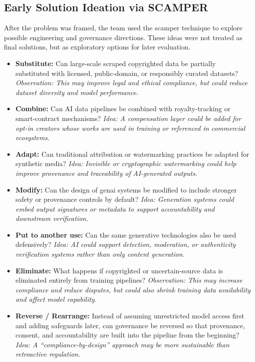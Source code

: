 \subsection{Early Solution Ideation via SCAMPER}\label{app:scamper}
After the problem was framed, the team used the \ac{scamper} technique to explore possible engineering and governance directions. These ideas were not treated as final solutions, but as exploratory options for later evaluation.

\begin{itemize}
    \item \textbf{Substitute:} Can large-scale scraped copyrighted data be partially substituted with licensed, public-domain, or responsibly curated datasets? \textit{Observation: This may improve legal and ethical compliance, but could reduce dataset diversity and model performance.}

    \item \textbf{Combine:} Can AI data pipelines be combined with royalty-tracking or smart-contract mechanisms? \textit{Idea: A compensation layer could be added for opt-in creators whose works are used in training or referenced in commercial ecosystems.}

    \item \textbf{Adapt:} Can traditional attribution or watermarking practices be adapted for synthetic media? \textit{Idea: Invisible or cryptographic watermarking could help improve provenance and traceability of AI-generated outputs.}

    \item \textbf{Modify:} Can the design of \ac{genai} systems be modified to include stronger safety or provenance controls by default? \textit{Idea: Generation systems could embed output signatures or metadata to support accountability and downstream verification.}

    \item \textbf{Put to another use:} Can the same generative technologies also be used defensively? \textit{Idea: AI could support detection, moderation, or authenticity verification systems rather than only content generation.}

    \item \textbf{Eliminate:} What happens if copyrighted or uncertain-source data is eliminated entirely from training pipelines? \textit{Observation: This may increase compliance and reduce disputes, but could also shrink training data availability and affect model capability.}

    \item \textbf{Reverse / Rearrange:} Instead of assuming unrestricted model access first and adding safeguards later, can governance be reversed so that provenance, consent, and accountability are built into the pipeline from the beginning? \textit{Idea: A ``compliance-by-design'' approach may be more sustainable than retroactive regulation.}
\end{itemize}

